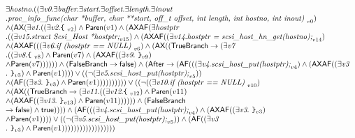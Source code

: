 \documentclass{article}
\newcommand{\AX}{\mbox{\sf{AX}}}
\newcommand{\AF}{\mbox{\sf{AF}}}
\newcommand{\mita}[1]{\mbox{\it{{#1}}}}
\newcommand{\msf}[1]{\mbox{\sf{{#1}}}}
\newcommand{\ttlb}{\mbox{\tt \char'173}}
\newcommand{\ttrb}{\mbox{\tt \char'175}}
\begin{document}
\[\begin{array}{l}
\exists \mita{hostno} . ((\exists \mita{v0} . \exists \mita{buffer} . \exists \mita{start} . \exists \mita{offset} . \exists \mita{length} . \exists \mita{inout}\\ . \mita{proc\_info\_func(char *buffer, char **start, off\_t offset, int length,
               int hostno, int inout) }_{v0})\\ \wedge (\AX(\exists \mita{v1} . ((\exists \mita{v2} . \mita{{\ttlb}
  }_{v2}) \wedge \msf{Paren}(v1) \wedge (\AX\AF(\exists \mita{hostptr}\\ . ((\exists \mita{v15} . \mita{struct Scsi\_Host *hostptr;}_{v15}) \wedge (\AX\AF((\exists \mita{v14} . \mita{hostptr = scsi\_host\_hn\_get(hostno);}_{v14})\\ \wedge (\AX\AF(((\exists \mita{v6} . \mita{if (hostptr == NULL) }_{v6}) \wedge (\AX((\msf{TrueBranch} \rightarrow (\exists \mita{v7}\\ . ((\exists \mita{v8} . \mita{{\ttlb}
  }_{v8}) \wedge \msf{Paren}(v7) \wedge (\AX\AF((\exists \mita{v9} . \mita{
{\ttrb}}_{v9})\\ \wedge \msf{Paren}(v7)))))) \wedge (\msf{FalseBranch} \rightarrow \msf{false}) \wedge (\msf{After} \rightarrow (\AF(((\exists \mita{v4} . \mita{scsi\_host\_put(hostptr);}_{v4}) \wedge (\AX\AF((\exists \mita{v3}\\ . \mita{
{\ttrb}}_{v3}) \wedge \msf{Paren}(v1)))) \vee ((\neg (\exists \mita{v5} . \mita{scsi\_host\_put(hostptr);}_{v5}))\\ \wedge (\AF((\exists \mita{v3} . \mita{
{\ttrb}}_{v3}) \wedge \msf{Paren}(v1)))))))))) \vee ((\neg ((\exists \mita{v10} . \mita{if (hostptr == NULL) }_{v10})\\ \wedge (\AX((\msf{TrueBranch} \rightarrow (\exists \mita{v11} . ((\exists \mita{v12} . \mita{{\ttlb}
  }_{v12}) \wedge \msf{Paren}(v11)\\ \wedge (\AX\AF((\exists \mita{v13} . \mita{
{\ttrb}}_{v13}) \wedge \msf{Paren}(v11)))))) \wedge (\msf{FalseBranch}\\ \rightarrow \msf{false}) \wedge \msf{true})))) \wedge (\AF(((\exists \mita{v4} . \mita{scsi\_host\_put(hostptr);}_{v4}) \wedge (\AX\AF((\exists \mita{v3} . \mita{
{\ttrb}}_{v3})\\ \wedge \msf{Paren}(v1)))) \vee ((\neg (\exists \mita{v5} . \mita{scsi\_host\_put(hostptr);}_{v5})) \wedge (\AF((\exists \mita{v3}\\ . \mita{
{\ttrb}}_{v3}) \wedge \msf{Paren}(v1))))))))))))))))))
\end{array}\]
\end{document}
